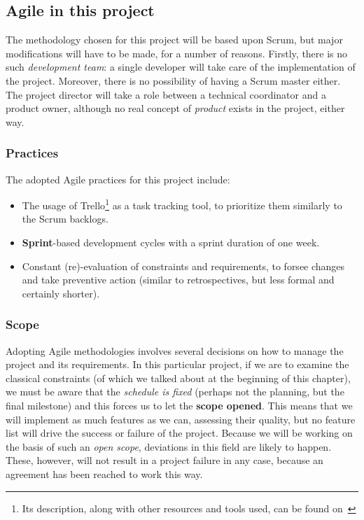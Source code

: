 \subsection{Agile in this project}

The methodology chosen for this project will be based upon Scrum, but major modifications will have to be made, for a number of reasons. Firstly, there is no such \textit{development team}: a single developer will take care of the implementation of the project. Moreover, there is no possibility of having a Scrum master either. The project director will take a role between a technical coordinator and a product owner, although no real concept of \textit{product} exists in the project, either way.

\subsubsection{Practices}

The adopted Agile practices for this project include:

\begin{itemize}
	\item The usage of Trello\footnote{Its description, along with other resources and tools used, can be found on~} as a task tracking tool, to prioritize them similarly to the Scrum backlogs.
	\item \textbf{Sprint}-based development cycles with a sprint duration of one week.
	\item Constant (re)-evaluation of constraints and requirements, to forsee changes and take preventive action (similar to retrospectives, but less formal and certainly shorter).
\end{itemize}

\subsubsection{Scope}

Adopting Agile methodologies involves several decisions on how to manage the project and its requirements. In this particular project, if we are to examine the classical constraints (of which we talked about at the beginning of this chapter), we must be aware that the \textit{schedule is fixed} (perhaps not the planning, but the final milestone) and this forces us to let the \textbf{scope opened}. This means that we will implement as much features as we can, assessing their quality, but no feature list will drive the success or failure of the project. Because we will be working on the basis of such an \textit{open scope}, deviations in this field are likely to happen. These, however, will not result in a project failure in any case, because an agreement has been reached to work this way.